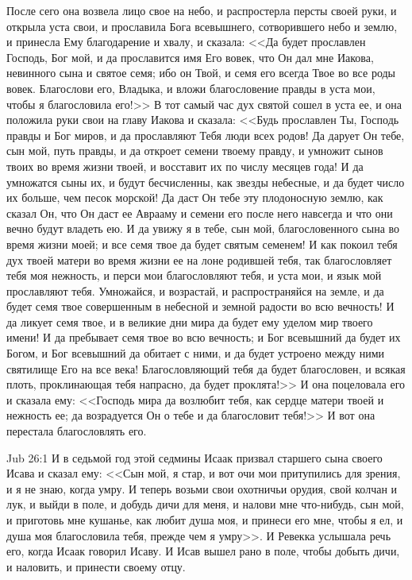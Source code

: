 После сего она возвела лицо свое на небо, и
распростерла персты своей руки, и открыла уста
свои, и прославила Бога всевышнего, сотворившего
небо и землю, и принесла Ему благодарение и хвалу,
и сказала: <<Да будет прославлен Господь, Бог
мой, и да прославится имя Его вовек, что Он дал мне
Иакова, невинного сына и святое семя; ибо он Твой,
и семя его всегда Твое во все роды вовек.
Благослови его, Владыка, и вложи благословение
правды в уста мои, чтобы я благословила его!>> В
тот самый час дух святой сошел в уста ее, и она
положила руки свои на главу Иакова и сказала:
<<Будь прославлен Ты, Господь правды и Бог
миров, и да прославляют Тебя люди всех родов! Да
дарует Он тебе, сын мой, путь правды, и да откроет
семени твоему правду, и умножит сынов твоих во
время жизни твоей, и восставит их по числу
месяцев года! И да умножатся сыны их, и будут
бесчисленны, как звезды небесные, и да будет
число их больше, чем песок морской! Да даст Он тебе
эту плодоносную землю, как сказал Он, что Он
даст ее Аврааму и семени его после него навсегда
и что они вечно будут владеть ею. И да увижу я в
тебе, сын мой, благословенного сына во время
жизни моей; и все семя твое да будет святым
семенем! И как покоил тебя дух твоей матери во
время жизни ее на лоне родившей тебя, так
благословляет тебя моя нежность, и перси мои
благословляют тебя, и уста мои, и язык мой
прославляют тебя. Умножайся, и возрастай, и
распространяйся на земле, и да будет семя твое
совершенным в небесной и земной радости во всю
вечность! И да ликует семя твое, и в великие дни
мира да будет ему уделом мир твоего имени! И да
пребывает семя твое во всю вечность; и Бог
всевышний да будет их Богом, и Бог всевышний да
обитает с ними, и да будет устроено между ними
святилище Его на все века! Благословляющий тебя
да будет благословен, и всякая плоть,
проклинающая тебя напрасно, да будет
проклята!>> И она поцеловала его и сказала ему:
<<Господь мира да возлюбит тебя, как сердце
матери твоей и нежность ее; да возрадуется Он о
тебе и да благословит тебя!>> И вот она
перестала благословлять его.

\vs Jub 26:1
И в седьмой год этой седмины Исаак призвал
старшего сына своего Исава и сказал ему: <<Сын
мой, я стар, и вот очи мои притупились для зрения,
и я не знаю, когда умру. И теперь возьми свои
охотничьи орудия, свой колчан и лук, и выйди в
поле, и добудь дичи для меня, и налови мне
что-нибудь, сын мой, и приготовь мне кушанье, как
любит душа моя, и принеси его мне, чтобы я ел, и
душа моя благословила тебя, прежде чем я умру>>.
И Ревекка услышала речь его, когда Исаак говорил
Исаву. И Исав вышел рано в поле, чтобы добыть дичи,
и наловить, и принести своему отцу.

